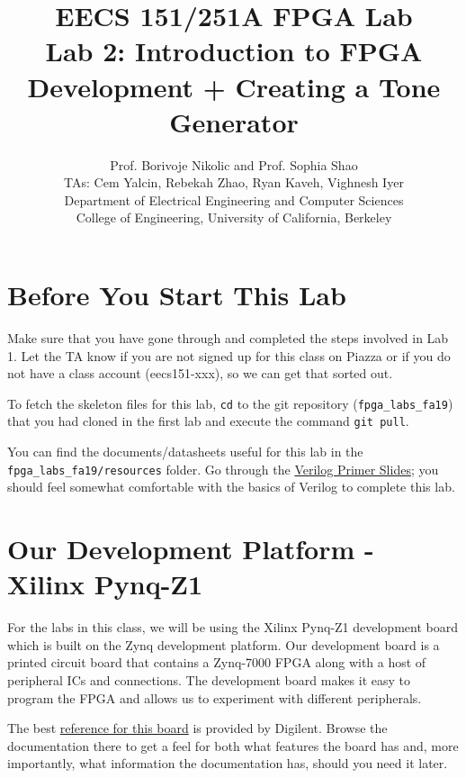 \documentclass[11pt]{article}
\newcommand{\repo}{fpga\_labs\_fa19}
\begin{document}
\title{EECS 151/251A FPGA Lab\\
Lab 2: Introduction to FPGA Development + Creating a Tone Generator}

\author{Prof. Borivoje Nikolic and Prof. Sophia Shao \\
TAs: Cem Yalcin, Rebekah Zhao, Ryan Kaveh, Vighnesh Iyer \\ Department of Electrical Engineering and Computer Sciences\\
College of Engineering, University of California, Berkeley}

\date{}
\maketitle

\section{Before You Start This Lab}

Make sure that you have gone through and completed the steps involved in Lab 1.
Let the TA know if you are not signed up for this class on Piazza or if you do not have a class account (eecs151-xxx), so we can get that sorted out.

To fetch the skeleton files for this lab, \texttt{cd} to the git repository (\texttt{\repo}) that you had cloned in the first lab and execute the command \texttt{git pull}.

You can find the documents/datasheets useful for this lab in the \texttt{\repo/resources} folder.
Go through the \href{http://inst.eecs.berkeley.edu/~eecs151/fa19/files/verilog/Verilog_Primer_Slides.pdf}{Verilog Primer Slides}; you should feel somewhat comfortable with the basics of Verilog to complete this lab.

\section{Our Development Platform - Xilinx Pynq-Z1}
For the labs in this class, we will be using the Xilinx Pynq-Z1 development board which is built on the Zynq development platform. Our development board is a printed circuit board that contains a Zynq-7000 FPGA along with a host of peripheral ICs and connections. The development board makes it easy to program the FPGA and allows us to experiment with different peripherals.

The best \href{https://reference.digilentinc.com/reference/programmable-logic/pynq-z1/reference-manual}{reference for this board} is provided by Digilent.
Browse the documentation there to get a feel for both what features the board has and, more importantly, what information the documentation has, should you need it later.
\end{document}
